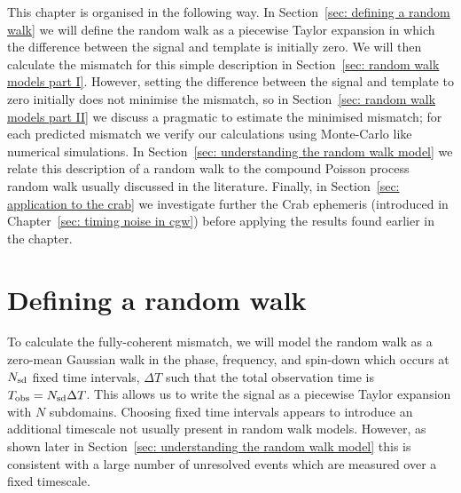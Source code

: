 \documentclass[../full_thesis/full_thesis.tex]{subfiles}
\begin{document}
{This chapter is organised in the following way. In Section~\ref{sec: defining a
random walk} we will define the random walk as a piecewise Taylor expansion in
which the difference between the signal and template is initially zero. We will
then calculate the mismatch for this simple description in Section~\ref{sec:
random walk models part I}. However, setting the difference between the signal
and template to zero initially does not minimise the mismatch, so in
Section~\ref{sec: random walk models part II} we discuss a pragmatic to
estimate the minimised mismatch; for each predicted mismatch we verify our
calculations using Monte-Carlo like numerical simulations. In Section~\ref{sec:
understanding the random walk model} we relate this description of a random walk to
the compound Poisson process random walk usually discussed in the literature.
Finally, in Section~\ref{sec: application to the crab} we investigate further
the Crab ephemeris (introduced in Chapter~\ref{sec: timing noise in cgw}) before
applying the results found earlier in the chapter.

}

\section{Defining a random walk}
\label{sec: defining a random walk}
To calculate the fully-coherent mismatch, we will model the random walk as a
zero-mean Gaussian walk in the phase, frequency, and spin-down which occurs at
$N_{\textrm{sd}}$ fixed time intervals, $\Delta T$ such that the total observation time is
$T_{\mathrm{obs}} = N_{\textrm{sd}} \Delta T$.
This allows us to write the signal as 
a piecewise Taylor expansion with $N$ subdomains. Choosing fixed time intervals appears to
introduce an additional timescale not usually present in random walk models.
However, as shown later in Section~\ref{sec: understanding the random walk model} this is consistent with a
large number of unresolved events which
are measured over a fixed timescale.
\end{document}
